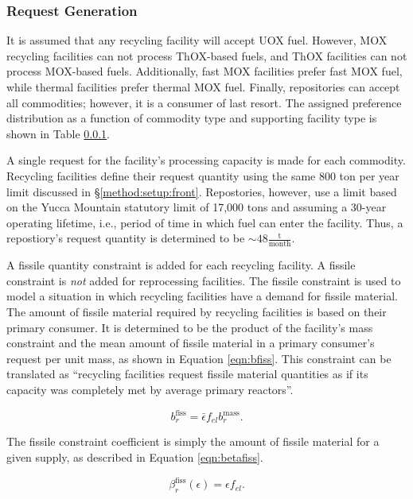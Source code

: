 \subsubsection{Request Generation}

It is assumed that any recycling facility will accept UOX fuel. However, MOX
recycling facilities can not process ThOX-based fuels, and ThOX facilities can
not process MOX-based fuels. Additionally, fast MOX facilities prefer fast MOX
fuel, while thermal facilities prefer thermal MOX fuel. Finally, repositories
can accept all commodities; however, it is a consumer of last resort. The
assigned preference distribution as a function of commodity type and supporting
facility type is shown in Table \ref{}.

A single request for the facility's processing capacity is made for each
commodity. Recycling facilities define their request quantity using the same 800
ton per year limit discussed in \S \ref{method:setup:front}. Repostories,
however, use a limit based on the Yucca Mountain statutory limit of 17,000 tons
and assuming a 30-year operating lifetime, i.e., period of time in which fuel
can enter the facility. Thus, a repostiory's request quantity is determined to
be $\sim 48 \frac{\text{t}}{\text{month}}$.

A fissile quantity constraint is added for each recycling facility. A fissile
constraint is \textit{not} added for reprocessing facilities. The fissile
constraint is used to model a situation in which recycling facilities have a
demand for fissile material. The amount of fissile material required by
recycling facilities is based on their primary consumer. It is determined to be
the product of the facility's mass constraint and the mean amount of fissile
material in a primary consumer's request per unit mass, as shown in Equation
\ref{eqn:bfiss}. This constraint can be translated as ``recycling facilities
request fissile material quantities as if its capacity was completely met by
average primary reactors''.

\begin{equation}\label{eqn:bfiss}
b^{\text{fiss}}_r = \bar{\epsilon} f_{el} b^{\text{mass}}_r.
\end{equation}

The fissile constraint coefficient is simply the amount of fissile material for
a given supply, as described in Equation \ref{eqn:betafiss}.

\begin{equation}\label{eqn:betafiss}
\beta^{\text{fiss}}_r(\epsilon) = \epsilon f_{el}.
\end{equation}

